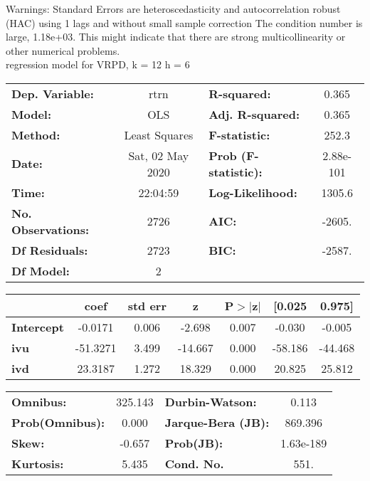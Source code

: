 Warnings: \newline
 [1] Standard Errors are heteroscedasticity and autocorrelation robust (HAC) using 1 lags and without small sample correction \newline
 [2] The condition number is large, 1.18e+03. This might indicate that there are \newline
 strong multicollinearity or other numerical problems.\\ 

regression model for VRPD, k = 12 h = 6\begin{center}
\begin{tabular}{lclc}
\toprule
\textbf{Dep. Variable:}    &       rtrn       & \textbf{  R-squared:         } &     0.365   \\
\textbf{Model:}            &       OLS        & \textbf{  Adj. R-squared:    } &     0.365   \\
\textbf{Method:}           &  Least Squares   & \textbf{  F-statistic:       } &     252.3   \\
\textbf{Date:}             & Sat, 02 May 2020 & \textbf{  Prob (F-statistic):} & 2.88e-101   \\
\textbf{Time:}             &     22:04:59     & \textbf{  Log-Likelihood:    } &    1305.6   \\
\textbf{No. Observations:} &        2726      & \textbf{  AIC:               } &    -2605.   \\
\textbf{Df Residuals:}     &        2723      & \textbf{  BIC:               } &    -2587.   \\
\textbf{Df Model:}         &           2      & \textbf{                     } &             \\
\bottomrule
\end{tabular}
\begin{tabular}{lcccccc}
                   & \textbf{coef} & \textbf{std err} & \textbf{z} & \textbf{P$> |$z$|$} & \textbf{[0.025} & \textbf{0.975]}  \\
\midrule
\textbf{Intercept} &      -0.0171  &        0.006     &    -2.698  &         0.007        &       -0.030    &       -0.005     \\
\textbf{ivu}       &     -51.3271  &        3.499     &   -14.667  &         0.000        &      -58.186    &      -44.468     \\
\textbf{ivd}       &      23.3187  &        1.272     &    18.329  &         0.000        &       20.825    &       25.812     \\
\bottomrule
\end{tabular}
\begin{tabular}{lclc}
\textbf{Omnibus:}       & 325.143 & \textbf{  Durbin-Watson:     } &     0.113  \\
\textbf{Prob(Omnibus):} &   0.000 & \textbf{  Jarque-Bera (JB):  } &   869.396  \\
\textbf{Skew:}          &  -0.657 & \textbf{  Prob(JB):          } & 1.63e-189  \\
\textbf{Kurtosis:}      &   5.435 & \textbf{  Cond. No.          } &      551.  \\
\bottomrule
\end{tabular}
\end{center}

